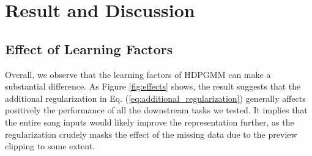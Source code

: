 \documentclass{article}
\begin{document}
\section{Result and Discussion}\label{sec:result_discussion}

\subsection{Effect of Learning Factors}\label{sec:result_discussion:learning_factors}

Overall, we observe that the learning factors of HDPGMM can make a substantial difference. As Figure \ref{fig:effects} shows, the result suggests that the additional regularization in Eq. (\ref{eq:additional_regularization}) generally affects positively the performance of all the downstream tasks we tested. It implies that the entire song inputs would likely improve the representation further, as the regularization crudely masks the effect of the missing data due to the preview clipping to some extent.
\end{document}

